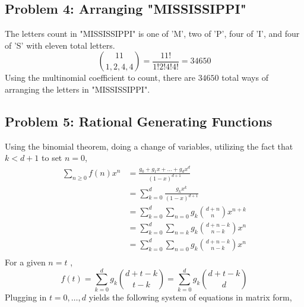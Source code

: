 \documentclass{report}
\begin{document}
\subsection*{Problem 4: Arranging "MISSISSIPPI"}
The letters count in "MISSISSIPPI" is one of 'M', two of 'P', four of 'I',
 and four of 'S' with eleven total letters.
\[
   \binom{11}{1, 2, 4, 4} = \frac{11!}{1!2!4!4!} = 34650
\]
Using the multinomial coefficient to count, 
there are $34650$ total ways of arranging the letters in "MISSISSIPPI".
\newpage 

\subsection*{Problem 5: Rational Generating Functions}
   Using the binomial theorem, doing a change of variables, 
   utilizing the fact that $k<d+1$ to set $n=0$,
   \begin{align*}
      \sum_{n \geq 0} f(n) x^n 
      &= \frac{g_0 + g_1x + \hdots + g_dx^d}{(1-x)^{d+1}} \\
      &= \sum_{k=0}^{d} \frac{g_kx^k}{(1-x)^{d+1}} \\
      &= \sum_{k=0}^{d} \sum_{n=0} g_k\binom{d+n}{n} x^{n+k} \\
      &= \sum_{k=0}^{d} \sum_{n=k} g_k\binom{d+n-k}{n-k} x^{n} \\
      &= \sum_{k=0}^{d} \sum_{n=0} g_k\binom{d+n-k}{n-k} x^{n} \\
   \end{align*}
   For a given $n=t$ ,
   \[
      f(t) = \sum_{k=0}^{d} g_k\binom{d+t-k}{t-k}  = \sum_{k=0}^{d} g_k\binom{d+t-k}{d}
   \]
   Plugging in $t=0,\hdots,d$ yields the following system of equations in matrix form,
\end{document}
